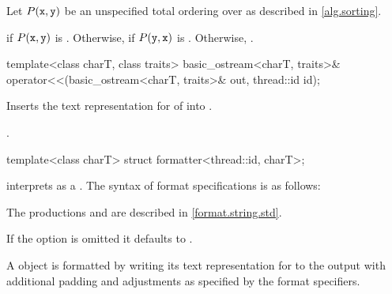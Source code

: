 \begin{itemdescr}
\pnum
Let $P(\texttt{\protect x}, \texttt{\protect y})$ be
an unspecified total ordering over 
as described in \ref{alg.sorting}.

\pnum
\returns
{} if $P(\texttt{\protect x}, \texttt{\protect y})$ is .
Otherwise, 
if $P(\texttt{\protect y}, \texttt{\protect x})$ is .
Otherwise, .
\end{itemdescr}

%
\begin{itemdecl}
template<class charT, class traits>
  basic_ostream<charT, traits>&
    operator<<(basic_ostream<charT, traits>& out, thread::id id);
\end{itemdecl}

\begin{itemdescr}
\pnum
\effects
Inserts the text representation for  of  into
.

\pnum
\returns
{}.
\end{itemdescr}

%
\begin{itemdecl}
template<class charT> struct formatter<thread::id, charT>;
\end{itemdecl}

\begin{itemdescr}
\pnum
{} interprets 
as a .
The syntax of format specifications is as follows:

\begin{ncbnf}
\br
     
\end{ncbnf}

\begin{note}
The productions  and 
are described in \ref{format.string.std}.
\end{note}

\pnum
If the  option is omitted it defaults to \tcode{>}.

\pnum
A  object is formatted by
writing its text representation for  to the output
with additional padding and adjustments as specified by the format specifiers.
\end{itemdescr}

